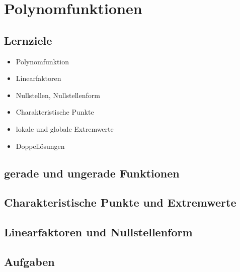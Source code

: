 
\section{Polynomfunktionen}

\subsection*{Lernziele}

\begin{itemize}
\item Polynomfunktion
\item Linearfaktoren
\item Nullstellen, Nullstellenform
\item Charakteristische Punkte
\item lokale und globale Extremwerte
\item Doppellösungen
\end{itemize}


\subsection{gerade und ungerade Funktionen}

\subsection{Charakteristische Punkte und Extremwerte}


\subsection{Linearfaktoren und Nullstellenform}


\subsection*{Aufgaben}




\newpage

